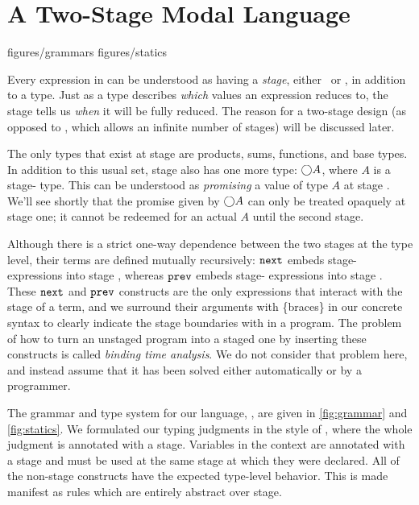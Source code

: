 

\section{A Two-Stage Modal Language}

 {figures/grammars}
 {figures/statics}

Every expression in \lang can be understood as having a {\em stage},
either \bbone~or \bbtwo, in addition to a type.
Just as a type describes \emph{which} values an expression reduces to,
the stage tells us \emph{when} it will be fully reduced. 
The reason for a two-stage design (as opposed to \cite{davies96}, which allows an infinite number of stages) will be discussed later.

The only types that exist at stage \bbtwo{} are products, sums, functions, and base types.
In addition to this usual set, stage \bbone{} also has one more type: $\bigcirc A$,
where $A$ is a stage-\bbtwo{} type.
This can be understood as \emph{promising} a value of type $A$ at stage \bbtwo.
We'll see shortly that the promise given by $\bigcirc A$ can only be treated opaquely at stage one; 
it cannot be redeemed for an actual $A$ until the second stage.

Although there is a strict one-way dependence between the two stages at the type
level, their terms are defined mutually recursively:
${\tt next}$ embeds stage-\bbtwo{} expressions into stage \bbone,
whereas ${\tt prev}$ embeds stage-\bbone{} expressions into stage \bbtwo.
These ${\tt next}$ and ${\tt prev}$ constructs are the only expressions that interact with the stage of a term,
and we surround their arguments with \{braces\} in our concrete syntax to clearly indicate the stage boundaries with in a program.
The problem of how to turn an unstaged program into a staged one by inserting these constructs is called {\em binding time analysis}.
We do not consider that problem here, and instead assume that it has been solved either automatically or by a programmer. 

The grammar and type system for our language, \lang, are given in
\ref{fig:grammar} and \ref{fig:statics}.
We formulated our typing judgments in the style of \cite{davies96}, where the whole judgment is annotated with a stage.  
Variables in the context are annotated with a stage and must be used at the same stage at which they were declared.
All of the non-stage constructs have the expected type-level behavior.  
This is made manifest as rules which are entirely abstract over stage.

